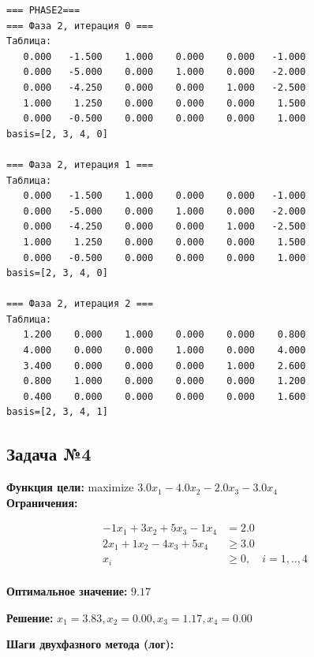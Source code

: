 \documentclass[a4paper,12pt]{article}
\begin{document}
\begin{verbatim}
=== PHASE2===
=== Фаза 2, итерация 0 ===
Таблица:
   0.000   -1.500    1.000    0.000    0.000   -1.000
   0.000   -5.000    0.000    1.000    0.000   -2.000
   0.000   -4.250    0.000    0.000    1.000   -2.500
   1.000    1.250    0.000    0.000    0.000    1.500
   0.000   -0.500    0.000    0.000    0.000    1.000
basis=[2, 3, 4, 0]

=== Фаза 2, итерация 1 ===
Таблица:
   0.000   -1.500    1.000    0.000    0.000   -1.000
   0.000   -5.000    0.000    1.000    0.000   -2.000
   0.000   -4.250    0.000    0.000    1.000   -2.500
   1.000    1.250    0.000    0.000    0.000    1.500
   0.000   -0.500    0.000    0.000    0.000    1.000
basis=[2, 3, 4, 0]

=== Фаза 2, итерация 2 ===
Таблица:
   1.200    0.000    1.000    0.000    0.000    0.800
   4.000    0.000    0.000    1.000    0.000    4.000
   3.400    0.000    0.000    0.000    1.000    2.600
   0.800    1.000    0.000    0.000    0.000    1.200
   0.400    0.000    0.000    0.000    0.000    1.600
basis=[2, 3, 4, 1]

\end{verbatim}



\subsection*{Задача №4}
\textbf{Функция цели: }
maximize $ 3.0x_{1} -4.0x_{2} -2.0x_{3} -3.0x_{4} $\\

\textbf{Ограничения:}

\[ \begin{aligned}
-1x_{1} +3x_{2} +5x_{3} -1x_{4} &= 2.0 \\
2x_{1} +1x_{2} -4x_{3} +5x_{4} &\ge 3.0 \\
x_i &\ge 0,\quad i=1,..,4\\
\end{aligned}\]

\textbf{Оптимальное значение: }$9.17$

\textbf{Решение: }$x_{1}=3.83, x_{2}=0.00, x_{3}=1.17, x_{4}=0.00$

\textbf{Шаги двухфазного метода (лог):}
\end{document}
